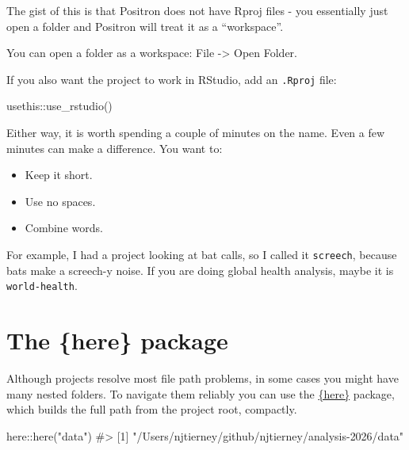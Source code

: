 \documentclass[
  letterpaper,
  justified,
  a4paper]{tufte-book}
\makeatletter
\newenvironment{Shaded}{\begin{snugshade}}{\end{snugshade}}
\newcommand{\CommentTok}[1]{\textcolor[rgb]{0.37,0.37,0.37}{#1}}
\newcommand{\FunctionTok}[1]{\textcolor[rgb]{0.28,0.35,0.67}{#1}}
\newcommand{\NormalTok}[1]{\textcolor[rgb]{0.00,0.23,0.31}{#1}}
\newcommand{\SpecialCharTok}[1]{\textcolor[rgb]{0.37,0.37,0.37}{#1}}
\newcommand{\StringTok}[1]{\textcolor[rgb]{0.13,0.47,0.30}{#1}}
\providecommand{\tightlist}{%
  \setlength{\itemsep}{0pt}\setlength{\parskip}{0pt}}
\providecommand{\tightlist}{%
  \setlength{\itemsep}{0pt}\setlength{\parskip}{0pt}}
\let\rbporigShaded\Shaded
\let\rbporigendShaded\endShaded
\renewenvironment{Shaded}{%
  \begingroup
  \ifdim\linewidth=\rbpbodywidth
    \advance\linewidth by \@tufte@overhang
    \advance\hsize by \@tufte@overhang
    \advance\columnwidth by \@tufte@overhang
  \fi
  \rbporigShaded
}{%
  \rbporigendShaded
  \endgroup
}
\makeatother
\begin{document}
\begin{tcolorbox}
The gist of this is that Positron does not have Rproj files - you
essentially just open a folder and Positron will treat it as a
``workspace''.

You can open a folder as a workspace: File -\textgreater{} Open Folder.

If you also want the project to work in RStudio, add an \texttt{.Rproj}
file:

\begin{Shaded}
\begin{Highlighting}[]
\NormalTok{usethis}\SpecialCharTok{::}\FunctionTok{use\_rstudio}\NormalTok{()}
\end{Highlighting}
\end{Shaded}

Either way, it is worth spending a couple of minutes on the name. Even a
few minutes can make a difference. You want to:

\begin{itemize}
\tightlist
\item
  Keep it short.
\item
  Use no spaces.
\item
  Combine words.
\end{itemize}

For example, I had a project looking at bat calls, so I called it
\texttt{screech}, because bats make a screech-y noise. If you are doing
global health analysis, maybe it is \texttt{world-health}.

\end{tcolorbox}

\section{The \{here\} package}\label{the-here-package}

Although projects resolve most file path problems, in some cases you
might have many nested folders. To navigate them reliably you can use
the \href{https://here.r-lib.org/}{\{here\}} package, which builds the
full path from the project root, compactly.

\begin{Shaded}
\begin{Highlighting}[]
\NormalTok{here}\SpecialCharTok{::}\FunctionTok{here}\NormalTok{(}\StringTok{"data"}\NormalTok{)}
\CommentTok{\#\textgreater{} [1] "/Users/njtierney/github/njtierney/analysis{-}2026/data"}
\end{Highlighting}
\end{Shaded}
\end{document}
